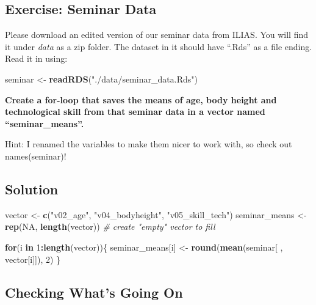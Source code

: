 \documentclass[
]{book}
\newenvironment{Shaded}{\begin{snugshade}}{\end{snugshade}}
\newcommand{\CommentTok}[1]{\textcolor[rgb]{0.56,0.35,0.01}{\textit{#1}}}
\newcommand{\ConstantTok}[1]{\textcolor[rgb]{0.56,0.35,0.01}{#1}}
\newcommand{\ControlFlowTok}[1]{\textcolor[rgb]{0.13,0.29,0.53}{\textbf{#1}}}
\newcommand{\DecValTok}[1]{\textcolor[rgb]{0.00,0.00,0.81}{#1}}
\newcommand{\FunctionTok}[1]{\textcolor[rgb]{0.13,0.29,0.53}{\textbf{#1}}}
\newcommand{\NormalTok}[1]{#1}
\newcommand{\OtherTok}[1]{\textcolor[rgb]{0.56,0.35,0.01}{#1}}
\newcommand{\SpecialCharTok}[1]{\textcolor[rgb]{0.81,0.36,0.00}{\textbf{#1}}}
\newcommand{\StringTok}[1]{\textcolor[rgb]{0.31,0.60,0.02}{#1}}
\begin{document}
\subsection{Exercise: Seminar Data}\label{exercise-seminar-data}

Please download an edited version of our seminar data from ILIAS. You will find it under \emph{data} as a zip folder. The dataset in it should have ``.Rds'' as a file ending. Read it in using:

\begin{Shaded}
\begin{Highlighting}[]
\NormalTok{seminar }\OtherTok{\textless{}{-}} \FunctionTok{readRDS}\NormalTok{(}\StringTok{"./data/seminar\_data.Rds"}\NormalTok{)}
\end{Highlighting}
\end{Shaded}

\textbf{Create a for-loop that saves the means of age, body height and technological skill from that seminar data in a vector named ``seminar\_means''.}

Hint: I renamed the variables to make them nicer to work with, so check out names(seminar)!

\subsection{Solution}\label{solution-1}

\begin{Shaded}
\begin{Highlighting}[]
\NormalTok{vector }\OtherTok{\textless{}{-}} \FunctionTok{c}\NormalTok{(}\StringTok{"v02\_age"}\NormalTok{, }\StringTok{"v04\_bodyheight"}\NormalTok{, }\StringTok{"v05\_skill\_tech"}\NormalTok{)}
\NormalTok{seminar\_means }\OtherTok{\textless{}{-}} \FunctionTok{rep}\NormalTok{(}\ConstantTok{NA}\NormalTok{, }\FunctionTok{length}\NormalTok{(vector)) }\CommentTok{\# create "empty" vector to fill}

\ControlFlowTok{for}\NormalTok{(i }\ControlFlowTok{in} \DecValTok{1}\SpecialCharTok{:}\FunctionTok{length}\NormalTok{(vector))\{}
\NormalTok{  seminar\_means[i] }\OtherTok{\textless{}{-}} \FunctionTok{round}\NormalTok{(}\FunctionTok{mean}\NormalTok{(seminar[ , vector[i]]), }\DecValTok{2}\NormalTok{)}
\NormalTok{\}}
\end{Highlighting}
\end{Shaded}

\subsection{Checking What's Going On}\label{checking-whats-going-on}
\end{document}
